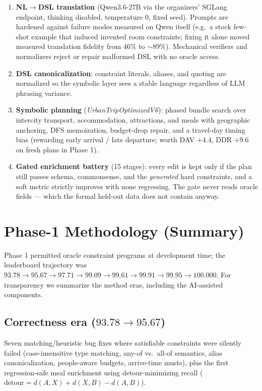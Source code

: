 \documentclass{article}
\begin{document}
\begin{enumerate}[leftmargin=1.3em,itemsep=1pt]
\item \textbf{NL$\to$DSL translation} (Qwen3.6-27B via the organizers'
SGLang endpoint, thinking disabled, temperature $0$, fixed seed). Prompts
are hardened against failure modes measured on Qwen itself (e.g.\ a stock
few-shot example that induced invented room constraints; fixing it alone
moved measured translation fidelity from $46\%$ to ${\sim}89\%$).
Mechanical verifiers and normalizers reject or repair malformed DSL with no
oracle access.
\item \textbf{DSL canonicalization}: constraint literals, aliases, and
quoting are normalized so the symbolic layer sees a stable language
regardless of LLM phrasing variance.
\item \textbf{Symbolic planning} (\emph{UrbanTripOptimizedV6}): phased
bundle search over intercity transport, accommodation, attractions, and
meals with geographic anchoring, DFS memoization, budget-drop repair, and a
travel-day timing bias (rewarding early arrival / late departure; worth
DAV $+4.4$, DDR $+9.6$ on fresh plans in Phase 1).
\item \textbf{Gated enrichment battery} (15 stages): every edit is kept
only if the plan still passes schema, commonsense, and the
\emph{generated} hard constraints, and a soft metric strictly improves with
none regressing. The gate never reads oracle fields --- which the formal
held-out data does not contain anyway.
\end{enumerate}

\section{Phase-1 Methodology (Summary)}
\label{sec:phase1}

Phase 1 permitted oracle constraint programs at development time; the
leaderboard trajectory was
$93.78 \to 95.67 \to 97.71 \to 99.09 \to 99.61 \to 99.91 \to 99.95 \to
100.000$. For transparency we summarize the method eras, including the
AI-assisted components.

\subsection{Correctness era ($93.78\!\to\!95.67$)}
Seven matching/heuristic bug fixes where satisfiable constraints were
silently failed (case-insensitive type matching, any-of vs.\ all-of
semantics, alias canonicalization, people-aware budgets, arrive-time
musts), plus the first regression-safe meal enrichment using
detour-minimizing recall ($\mathrm{detour}=d(A,X)+d(X,B)-d(A,B)$).
\end{document}
